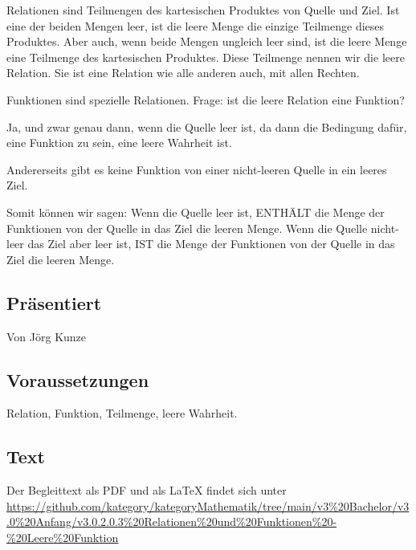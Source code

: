 \documentclass[a4paper]{amsart}
\theoremstyle{definition}
\begin{document}
Relationen sind Teilmengen des kartesischen Produktes von Quelle und Ziel. Ist eine der beiden Mengen leer, ist die leere Menge die einzige Teilmenge dieses Produktes. Aber auch, wenn beide Mengen ungleich leer sind, ist die leere Menge eine Teilmenge des kartesischen Produktes. Diese Teilmenge nennen wir die leere Relation. Sie ist eine Relation wie alle anderen auch, mit allen Rechten.

Funktionen sind spezielle Relationen. Frage: ist die leere Relation eine Funktion?

Ja, und zwar genau dann, wenn die Quelle leer ist, da dann die Bedingung dafür, eine Funktion zu sein, eine leere Wahrheit ist.

Andererseits gibt es keine Funktion von einer nicht-leeren Quelle in ein leeres Ziel. 

Somit können wir sagen:
Wenn die Quelle leer ist, ENTHÄLT die Menge der Funktionen von der Quelle in das Ziel die leeren Menge. Wenn die Quelle nicht-leer das Ziel aber leer ist, IST die Menge der Funktionen von der Quelle in das Ziel die leeren Menge.

\subsection*{Präsentiert}
Von Jörg Kunze

\subsection*{Voraussetzungen}
Relation, Funktion, Teilmenge, leere Wahrheit.

\subsection*{Text}
Der Begleittext als PDF und als LaTeX findet sich unter
{\tiny
   \url{https://github.com/kategory/kategoryMathematik/tree/main/v3%20Bachelor/v3.0%20Anfang/v3.0.2.0.3%20Relationen%20und%20Funktionen%20-%20Leere%20Funktion}
}
\end{document}

